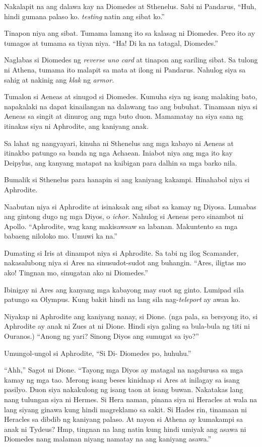 \documentclass[12pt,letterpaper]{report}
\begin{document}
Nakalapit na ang dalawa kay na Diomedes at Sthenelus. Sabi ni Pandarus, ``Huh, hindi gumana palaso ko. \textit{testing} natin ang sibat ko.''

Tinapon niya ang sibat. Tumama lamang ito sa kalasag ni Diomedes. Pero ito ay tumagos at tumama sa tiyan niya. ``Ha! Di ka na tatagal, Diomedes.''

Naglabas si Diomedes ng \textit{reverse uno card} at tinapon ang sariling sibat. Sa tulong ni Athena, tumama ito malapit sa mata at ilong ni Pandarus. Nahulog siya sa sahig at nakinig ang \textit{klak} ng \textit{armor}.

Tumalon si Aeneas at sinugod si Diomedes. Kumuha siya ng isang malaking bato, napakalaki na dapat kinailangan na dalawang tao ang bubuhat. Tinamaan niya si Aeneas sa singit at dinurog ang mga buto duon. Mamamatay na siya sana ng itinakas siya ni Aphrodite, ang kaniyang anak.

Sa lahat ng nangyayari, kinuha ni Sthenelus ang mga kabayo ni Aeneas at itinakbo patungo sa banda ng nga Achaean. Iniabot niya ang mga ito kay Deipylus, ang kanyang matapat na kaibigan para dalhin sa mga barko nila.

Bumalik si Sthenelus para hanapin si ang kaniyang kakampi. Hinahabol niya si Aphrodite.

Naabutan niya si Aphrodite at isinaksak ang sibat sa kamay ng Diyosa. Lumabas ang gintong dugo ng mga Diyos, o \textit{ichor}. Nahulog si Aeneas pero sinambot ni Apollo. ``Aphrodite, wag kang makisawsaw sa labanan. Makuntento sa mga babaeng niloloko mo. Umuwi ka na.''

Dumating si Iris at dinampot niya si Aphrodite. Sa tabi ng ilog Scamander, nakasalubong niya si Ares na sinusudot-sudot ang buhangin. ``Ares, iligtas mo ako! Tingnan mo, sinugatan ako ni Diomedes.''

Ibinigay ni Ares ang kanyang mga kabayong may suot ng ginto. Lumipad sila patungo sa Olympus. Kung bakit hindi na lang sila nag-\textit{teleport} ay awan ko.

Niyakap ni Aphrodite ang kaniyang nanay, si Dione. (nga pala, sa bersyong ito, si Aphrodite ay anak ni Zues at ni Dione. Hindi siya galing sa bula-bula ng titi ni Ouranos.) ``Anong ng yari? Sinong Diyos ang sumugat sa iyo?''

Umungol-ungol si Aphrodite, ``Si Di- Diomedes po, huhuhu.''

``Ahh,'' Sagot ni Dione. ``Tayong mga Diyos ay matagal na nagdurusa sa mga kamay ng mga tao. Merong isang beses kinidnap si Ares at inilagay sa isang pasilyo. Duon siya nakakulong ng isang taon at isang buwan. Nakatakas lang nang tulungan siya ni Hermes. Si Hera naman, pinana siya ni Heracles at wala na lang siyang ginawa kung hindi magreklamo sa sakit. Si Hades rin, tinamaan ni Heracles sa dibdib ng kaniyang palaso. At nayon si Athena ay kumakampi sa anak ni Tydeus? Hmp, tingnan na lang natin kung hindi umiyak ang asawa ni Diomedes nang malaman niyang namatay na ang kaniyang asawa.''
\end{document}
